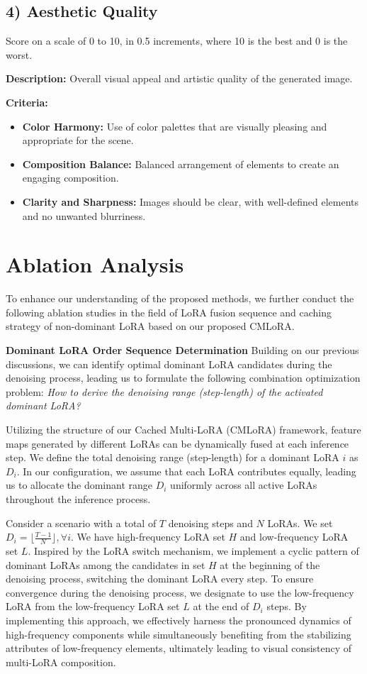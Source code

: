 \subsection*{4) Aesthetic Quality}

Score on a scale of 0 to 10, in 0.5 increments, where 10 is the best and 0 is the worst.

\textbf{Description:} Overall visual appeal and artistic quality of the generated image.

\textbf{Criteria:}
\begin{itemize}
    \item \textbf{Color Harmony:} Use of color palettes that are visually pleasing and appropriate for the scene.
    \item \textbf{Composition Balance:} Balanced arrangement of elements to create an engaging composition.
    \item \textbf{Clarity and Sharpness:} Images should be clear, with well-defined elements and no unwanted blurriness.
\end{itemize}

\section{Ablation Analysis}
\label{app:ablation}
To enhance our understanding of the proposed methods, we further conduct the following ablation studies in the field of LoRA fusion sequence and caching strategy of non-dominant LoRA based on our proposed CMLoRA.

\textbf{Dominant LoRA Order Sequence Determination}
Building on our previous discussions, we can identify optimal dominant LoRA candidates during the denoising process, leading us to formulate the following combination optimization problem: \textit{How to derive the denoising range (step-length) of the activated dominant LoRA?}

Utilizing the structure of our Cached Multi-LoRA (CMLoRA) framework, feature maps generated by different LoRAs can be dynamically fused at each inference step. We define the total denoising range (step-length) for a dominant LoRA $i$ as $D_{i}$. In our configuration, we assume that each LoRA contributes equally, leading us to allocate the dominant range $D_{i}$ uniformly across all active LoRAs throughout the inference process.

Consider a scenario with a total of $T$ denoising steps and $N$ LoRAs. We set $ D_{i}=\lfloor\frac{T-1}{N}\rfloor, \forall i$. We have high-frequency LoRA set $H$ and low-frequency LoRA set $L$. Inspired by the LoRA switch mechanism, we implement a cyclic pattern of dominant LoRAs among the candidates in set $H$ at the beginning of the denoising process, switching the dominant LoRA every step. To ensure convergence during the denoising process, we designate to use the low-frequency LoRA from the low-frequency LoRA set $L$ at the end of $D_{i}$ steps. By implementing this approach, we effectively harness the pronounced dynamics of high-frequency components while simultaneously benefiting from the stabilizing attributes of low-frequency elements, ultimately leading to visual consistency of multi-LoRA composition.

